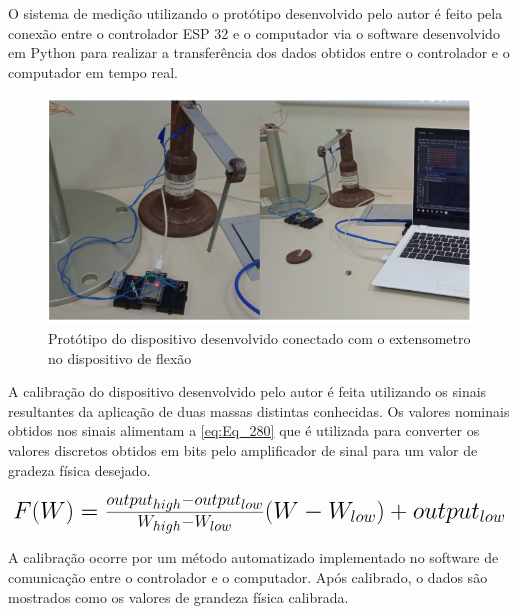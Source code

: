 O sistema de medição utilizando o protótipo desenvolvido pelo autor é feito pela conexão entre o controlador ESP 32 e o computador via o software desenvolvido em Python
para realizar a transferência dos dados obtidos entre o controlador e o computador em tempo real.

\begin{figure}[htb]
	\caption{\label{fig:2070} Protótipo do dispositivo desenvolvido conectado com o extensometro no dispositivo de flexão}
	\begin{center}
		\includegraphics[width=\textwidth]{pictures/2070.png}
	\end{center}
\end{figure}

A calibração do dispositivo desenvolvido pelo autor é feita utilizando os sinais resultantes da aplicação de duas massas distintas conhecidas.
Os valores nominais obtidos nos sinais alimentam a \autoref{eq:Eq_280} que é utilizada para converter os valores discretos obtidos em bits pelo
amplificador de sinal para um valor de gradeza física desejado.

\begin{equation}\label{eq:Eq_280}%
\mbox{\fontsize{17.28}{21.6}\selectfont\( %
F(W) = \frac{output_{high}-output_{low}}{W_{high}-W_{low}}(W - W_{low}) + output_{low}
\)} %
\end{equation}

%
%
%
%
%
%

\hfill

A calibração ocorre por um método automatizado implementado no software de comunicação entre o controlador e o computador.
Após calibrado, o dados são mostrados como os valores de grandeza física calibrada.

